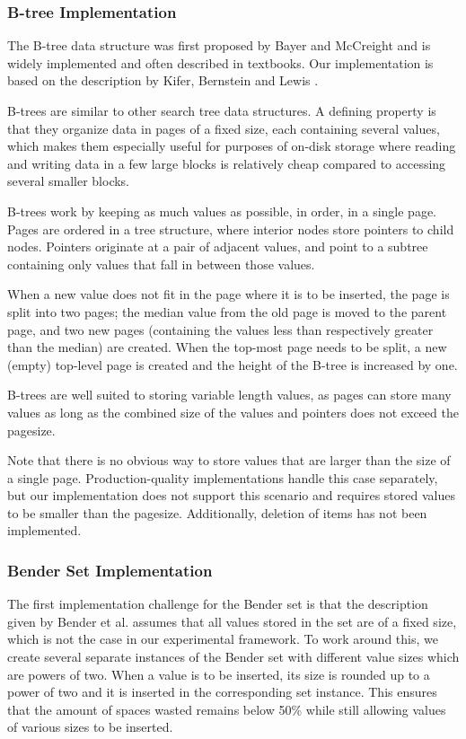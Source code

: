 \documentclass{acm_proc_article-sp}
\begin{document}
\subsubsection{B-tree Implementation}
The B-tree data structure was first proposed by Bayer and McCreight
\cite{bayer1970oam} and is widely implemented and often described in
textbooks. Our implementation is based on the description by Kifer, Bernstein
and Lewis \cite{kifer2006dsa}.

B-trees are similar to other search tree data structures. A defining property
is that they organize data in pages of a fixed size, each containing several
values, which makes them especially useful for purposes of on-disk storage
where reading and writing data in a few large blocks is relatively cheap
compared to accessing several smaller blocks.

B-trees work by keeping as much values as possible, in order, in a single
page. Pages are ordered in a tree structure, where interior nodes store
pointers to child nodes. Pointers originate at a pair of adjacent values,
and point to a subtree containing only values that fall in between those
values.

When a new value does not fit in the page where it is to be inserted,
the page is split into two pages; the median value from the old page is
moved to the parent page, and two new pages (containing the values less
than respectively greater than the median) are created. When the top-most
page needs to be split, a new (empty) top-level page is created and the height
of the B-tree is increased by one.

B-trees are well suited to storing variable length values, as pages can
store many values as long as the combined size of the values and pointers
does not exceed the pagesize.


Note that there is no obvious way to store values that are larger than the
size of a single page. Production-quality implementations handle this case
separately, but our implementation does not support this scenario and
requires stored values to be smaller than the pagesize. Additionally,
deletion of items has not been implemented.

\subsubsection{Bender Set Implementation}
The first implementation challenge for the Bender set is that the description
given by Bender et al. assumes that all values stored in the set are of a
fixed size, which is not the case in our experimental framework. To work
around this, we create several separate instances of the Bender set with
different value sizes which are powers of two. When a value is to be inserted,
its size is rounded up to a power of two and it is inserted in the
corresponding set instance. This ensures that the amount of spaces wasted
remains below 50\% while still allowing values of various sizes to be inserted.
\end{document}
